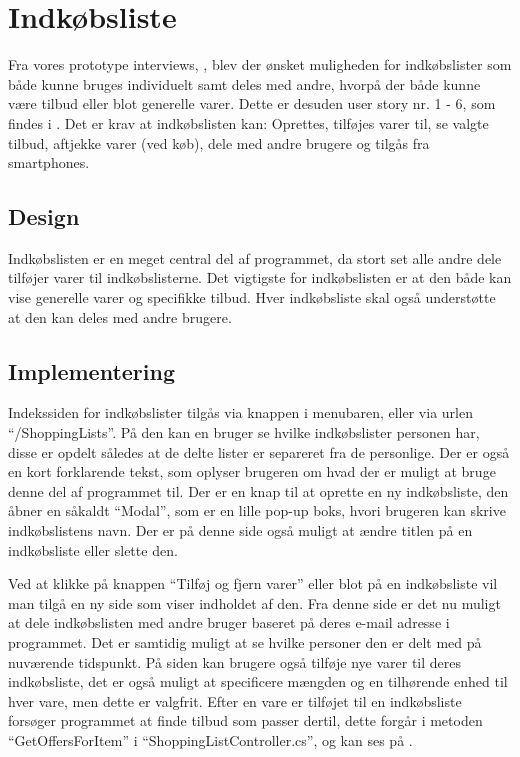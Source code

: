 \section{Indkøbsliste} 
Fra vores prototype interviews, , blev der ønsket muligheden for indkøbslister som både kunne bruges individuelt samt deles med andre, hvorpå der både kunne være tilbud eller blot generelle varer. 
Dette er desuden user story nr. 1 - 6, som findes i . 
Det er krav at indkøbslisten kan: Oprettes, tilføjes varer til, se valgte tilbud, aftjekke varer (ved køb), dele med andre brugere og tilgås fra smartphones.

\subsection{Design}

Indkøbslisten er en meget central del af programmet, da stort set alle andre dele tilføjer varer til indkøbslisterne.
Det vigtigste for indkøbslisten er at den både kan vise generelle varer og specifikke tilbud. 
Hver indkøbsliste skal også understøtte at den kan deles med andre brugere. 
\subsection{Implementering}

Indekssiden for indkøbslister tilgås via knappen i menubaren, eller via urlen ``/ShoppingLists''.
På den kan en bruger se hvilke indkøbslister personen har, disse er opdelt således at de delte lister er separeret fra de personlige.
Der er også en kort forklarende tekst, som oplyser brugeren om hvad der er muligt at bruge denne del af programmet til.
Der er en knap til at oprette en ny indkøbsliste, den åbner en såkaldt ``Modal'', som er en lille pop-up boks, hvori brugeren kan skrive indkøbslistens navn. 
Der er på denne side også muligt at ændre titlen på en indkøbsliste eller slette den.

Ved at klikke på knappen ``Tilføj og fjern varer'' eller blot på en indkøbsliste vil man tilgå en ny side som viser indholdet af den.
Fra denne side er det nu muligt at dele indkøbslisten med andre bruger baseret på deres e-mail adresse i programmet.
Det er samtidig muligt at se hvilke personer den er delt med på nuværende tidspunkt.
På siden kan brugere også tilføje nye varer til deres indkøbsliste, det er også muligt at specificere mængden og en tilhørende enhed til hver vare, men dette er valgfrit.
Efter en vare er tilføjet til en indkøbsliste forsøger programmet at finde tilbud som passer dertil, dette forgår i metoden ``GetOffersForItem'' i ``ShoppingListController.cs'', og kan ses på .

